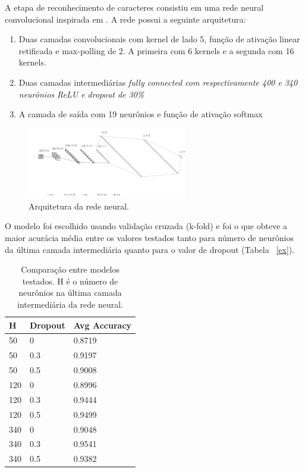 \documentclass[11pt]{article}
\begin{document}
A etapa de reconhecimento de caracteres consistiu em uma rede neural convolucional inspirada em \cite{kopp2017}. A rede possui a seguinte arquitetura:

\begin{enumerate}
\item
    Duas camadas convolucionais com kernel de lado 5, função de ativação linear retificada e max-polling de 2. A primeira com 6 kernels e a segunda com 16 kernels.
\item
    Duas camadas intermediárias \em fully connected \em com respectivamente 400 e 340 neurônios ReLU e dropout de 30\%
\item
    A camada de saída com 19 neurônios e função de ativação softmax
\end{enumerate}

  \begin{figure}[H]
        {\centering
        \includegraphics[width=70mm]{images/nn.png}
        \caption{Arquitetura da rede neural.}
        \label{fig:nn}\par}
  \end{figure}

O modelo foi escolhido usando validação cruzada (k-fold) e foi o que obteve a maior acurácia média entre os valores testados tanto para número de neurônios da última camada intermediária quanto para o valor de dropout (Tabela ~\ref{ex}).

\begin{table}[H]
    {\centering
\begin{tabular}{@{}lll@{}}
\toprule
H   & Dropout & Avg Accuracy \\ \midrule
50  & 0       & 0.8719       \\
50  & 0.3     & 0.9197       \\
50  & 0.5     & 0.9008       \\
120 & 0       & 0.8996       \\
120 & 0.3     & 0.9444       \\
120 & 0.5     & 0.9499       \\
340 & 0       & 0.9048       \\
340 & 0.3     & 0.9541       \\
340 & 0.5     & 0.9382       \\ \bottomrule
\end{tabular}
\caption{Comparação entre modelos testados. H é o número de neurônios na última camada intermediária da rede neural.}
\label{tab:ex}
    \par}
\end{table}
\end{document}
